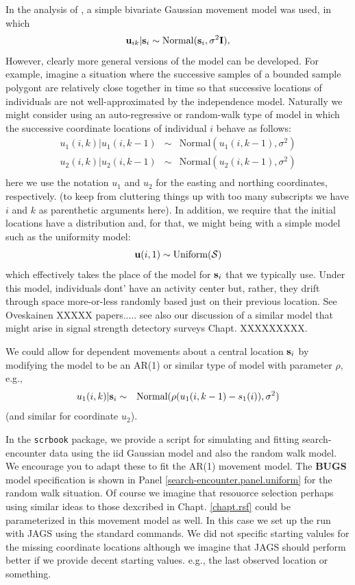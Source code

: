 In the analysis of \citet{royle_young:2008}, a simple bivariate
Gaussian movement model was used, in which
\[
 {\bf u}_{ik} | {\bf s}_{i} \sim \mbox{Normal}({\bf s}_{i}, \sigma^{2}{\bf I}),
\]
However, clearly more general versions of the model can be developed.
For example, imagine a situation where the successive samples of a
bounded sample polygont are relatively close together in time so that
successive locations of individuals are not well-approximated by the
independence model. Naturally we might consider using an
auto-regressive or random-walk type of model in which
the successive coordinate locations of individual $i$ behave as follows:
\begin{eqnarray*}
 u_{1}(i,k) | u_{1}(i,k-1) &\sim &  \mbox{Normal}( u_{1}(i,k-1),  \sigma^{2}) \\
 u_{2}(i,k) | u_{2}(i,k-1) &\sim &  \mbox{Normal}( u_{2}(i,k-1),  \sigma^{2}) \\
\end{eqnarray*}
here we use the notation $u_{1}$ and $u_{2}$ for the easting and
northing coordinates, respectively. (to keep from cluttering things up
with too many subscripts we have $i$ and $k$ as parenthetic arguments
here).   In addition, we require that the initial locations have a
distribution and, for that, we might being with a simple model such as
the uniformity model:
\[
 {\bf u}(i,1) \sim \mbox{Uniform}({\cal S})
\]
which effectively takes the place of the model for ${\bf s}_{i}$ that
we typically use. Under this model, individuals dont' have an activity
center but, rather, they drift through space more-or-less randomly
based just on their previous location. See Oveskainen XXXXX
papers..... see also our discussion of a similar model that might
arise in signal strength detectory surveys Chapt. XXXXXXXXX.

We could allow for dependent movements about a central location ${\bf
  s}_{i}$ by modifying the model to be an AR(1) or similar type of
model with parameter $\rho$, e.g.,
\begin{eqnarray*}
 u_{1}(i,k) | {\bf s}_{i} &\sim &  \mbox{Normal}( \rho ( u_{1}(i,k-1)
 - s_{1}(i) ),  \sigma^{2}) \\
\end{eqnarray*}
(and similar for coordinate $u_{2}$).

In the \mbox{\tt scrbook} package, we provide a script for
simulating and fitting search-encounter data using the iid Gaussian
model and also the random walk model. We encourage you to adapt these
to fit the AR(1) movement model.   The {\bf BUGS} model specification
is shown in Panel \ref{search-encounter.panel.uniform} for the random
walk situation.  Of course we imagine that resouorce selection
perhaps using similar ideas to those dexcribed in
Chapt. \ref{chapt.rsf} could be parameterized in this movement model
as well. In this case we set up the run with JAGS using the standard
commands. We did not specific starting valules for the missing
coordinate locations although we imagine that JAGS should perform
better if we provide decent starting values. e.g., the last observed
location or something.

